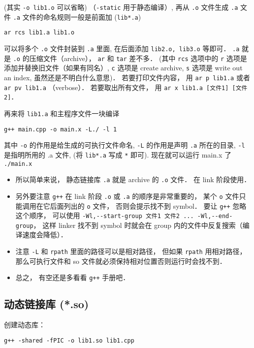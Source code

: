 (其实 \verb`-o lib1.o` 可以省略) （\verb`-static` 用于静态编译）, 再从 \verb|.o| 文件生成 \verb|.a| 文件 \verb|.a| 文件的命名规则一般是前面加 (\verb`lib*.a`)

\begin{lstlisting}[language=none]
ar rcs lib1.a lib1.o
\end{lstlisting}
可以将多个 \verb|.o| 文件封装到 \verb|.a| 里面, 在后面添加 \verb|lib2.o, lib3.o| 等即可． \verb`.a` 就是 \verb`.o` 的压缩文件（archive）， \verb`ar` 和 \verb`tar` 差不多． (其中 \verb|rcs| 选项中的 \verb`r` 选项是添加并替换旧文件（如果有同名）, \verb`c` 选项是 create archive, \verb`s` 选项是 write out an index, 虽然还是不明白什么意思)． 若要打印文件内容， 用 \verb|ar p lib1.a| 或者 \verb|ar pv lib1.a| （verbose）． 若要取出所有文件， 用 \verb|ar x lib1.a [文件1] [文件2]|．

再来将 \verb|lib1.a| 和主程序文件一块编译
\begin{lstlisting}[language=none]
g++ main.cpp -o main.x -L./ -l 1
\end{lstlisting}

其中 \verb`-o` 的作用是给生成的可执行文件命名, \verb`-L` 的作用是声明 \verb`.a` 所在的目录, \verb`-l` 是指明所用的 .a 文件, (将 \verb`lib*.a` 写成 \verb`*` 即可).
现在就可以运行 main.x 了
\verb`./main.x`

\begin{itemize}
\item 所以简单来说， 静态链接库 \verb`.a` 就是 archive 的 \verb`.o` 文件． 在 link 阶段使用．
\item 另外要注意 \verb`g++` 在 link 阶段 \verb`.o` 或 \verb`.a` 的顺序是非常重要的， 某个 \verb`o` 文件只能调用在它后面列出的 \verb`o` 文件， 否则会提示找不到 symbol． 要让 \verb`g++` 忽略这个顺序， 可以使用
\verb`-Wl,--start-group 文件1 文件2 ... -Wl,--end-group`， 这样 linker 找不到 symbol 时就会在 group 内的文件中反复搜索（编译速度会降低）．
\item 注意 \verb|-L| 和 \verb|rpath| 里面的路径可以是相对路径， 但如果 \verb|rpath| 用相对路径， 那么可执行文件和 so 文件就必须保持相对位置否则运行时会找不到．
\item 总之， 有空还是多看看 \verb`g++` 手册吧．
\end{itemize}

\subsection{动态链接库 (*.so)}
创建动态库：
\begin{lstlisting}[language=none]
g++ -shared -fPIC -o lib1.so lib1.cpp
\end{lstlisting}

